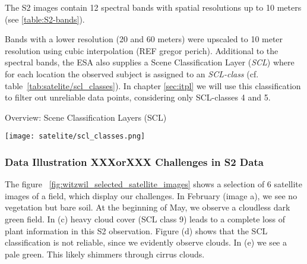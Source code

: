 {		%
		{
			The S2 images contain 12 spectral bands with spatial resolutions up to 10 meters (see \ref{table:S2-bands}).   
			
			Bands with a lower resolution (20 and 60 meters) were upscaled to 10 meter resolution using cubic interpolation (REF gregor perich).
			Additional to the spectral bands, the ESA also supplies a Scene Classification Layer (\textit{SCL}) where for each location the observed subject is assigned to an \textit{SCL-class} (cf. table~\ref{tab:satelite/scl_classes}). In chapter \ref{sec:itpl}  we will use this classification to filter out unreliable data points, considering only SCL-classes 4 and 5.  
			
			
			\begin{table}[h]
				\caption{Overview: Scene Classification Layers (SCL)}
				\label{tab:satelite/scl_classes}
				\center
				\texttt{[image: satelite/scl\_classes.png]}
			\end{table}
		}

		\subsubsection*{Data Illustration XXXorXXX Challenges in S2 Data}{
			The figure ~\ref{fig:witzwil_selected_satellite_images} shows a selection of 6 satellite images of a field, which display our challenges. In February (image a), we see no vegetation but bare soil. At the beginning of May, we observe a cloudless dark green field. In (c) heavy cloud cover (SCL class 9) leads to a complete loss of plant information in this S2 observation. Figure (d) shows that the SCL classification is not reliable, since we evidently observe clouds. In (e) we see a pale green. This likely shimmers through cirrus clouds. 
			
		}
	}

